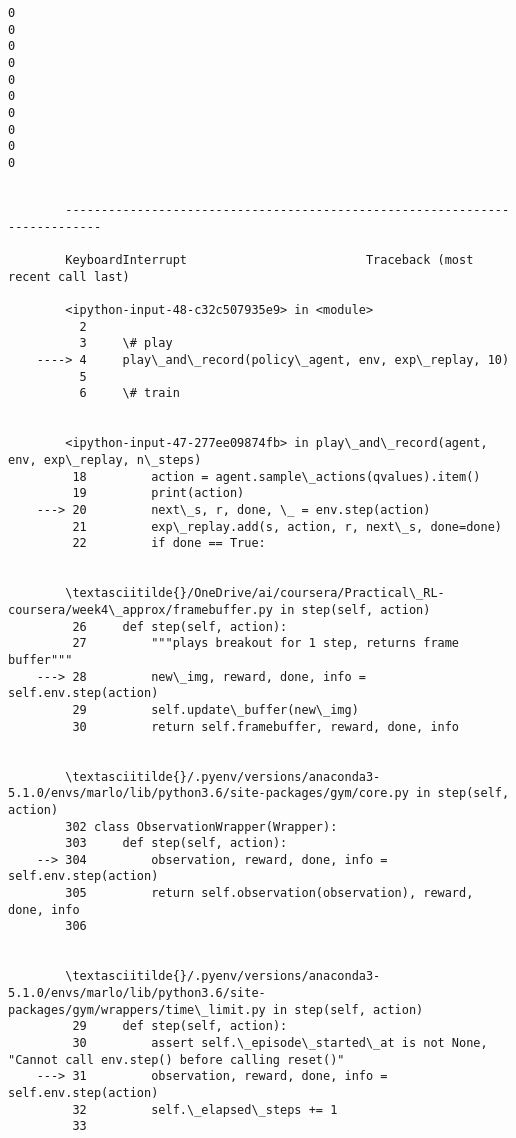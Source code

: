 \documentclass[11pt]{article}
\begin{document}
    \begin{Verbatim}[commandchars=\\\{\}]
0
0
0
0
0
0
0
0
0
0

    \end{Verbatim}

    \begin{Verbatim}[commandchars=\\\{\}]

        ---------------------------------------------------------------------------

        KeyboardInterrupt                         Traceback (most recent call last)

        <ipython-input-48-c32c507935e9> in <module>
          2 
          3     \# play
    ----> 4     play\_and\_record(policy\_agent, env, exp\_replay, 10)
          5 
          6     \# train


        <ipython-input-47-277ee09874fb> in play\_and\_record(agent, env, exp\_replay, n\_steps)
         18         action = agent.sample\_actions(qvalues).item()
         19         print(action)
    ---> 20         next\_s, r, done, \_ = env.step(action)
         21         exp\_replay.add(s, action, r, next\_s, done=done)
         22         if done == True:


        \textasciitilde{}/OneDrive/ai/coursera/Practical\_RL-coursera/week4\_approx/framebuffer.py in step(self, action)
         26     def step(self, action):
         27         """plays breakout for 1 step, returns frame buffer"""
    ---> 28         new\_img, reward, done, info = self.env.step(action)
         29         self.update\_buffer(new\_img)
         30         return self.framebuffer, reward, done, info


        \textasciitilde{}/.pyenv/versions/anaconda3-5.1.0/envs/marlo/lib/python3.6/site-packages/gym/core.py in step(self, action)
        302 class ObservationWrapper(Wrapper):
        303     def step(self, action):
    --> 304         observation, reward, done, info = self.env.step(action)
        305         return self.observation(observation), reward, done, info
        306 


        \textasciitilde{}/.pyenv/versions/anaconda3-5.1.0/envs/marlo/lib/python3.6/site-packages/gym/wrappers/time\_limit.py in step(self, action)
         29     def step(self, action):
         30         assert self.\_episode\_started\_at is not None, "Cannot call env.step() before calling reset()"
    ---> 31         observation, reward, done, info = self.env.step(action)
         32         self.\_elapsed\_steps += 1
         33 



\end{Verbatim}
\end{document}
